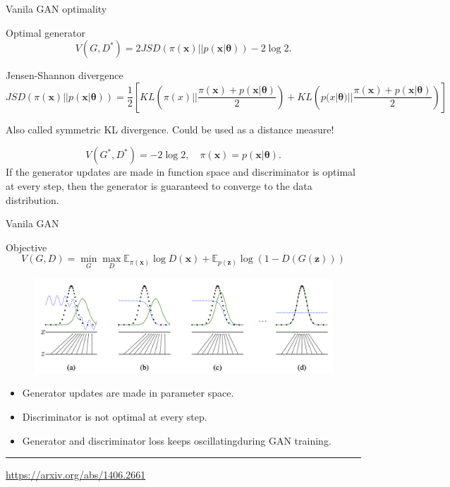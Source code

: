 \documentclass{beamer}
\newcommand{\bx}{\mathbf{x}}
\newcommand{\bz}{\mathbf{z}}
\newcommand{\bbE}{\mathbb{E}}
\newcommand{\btheta}{\boldsymbol{\theta}}
\begin{document}
\begin{frame}{Vanila GAN optimality}
	\begin{block}{Optimal generator}
		\vspace{-0.2cm}
		\[
			V(G, D^*)  = 2JSD(\pi(\bx) || p(\bx | \btheta)) - 2\log 2.
		\]
	\end{block}
	\begin{block}{Jensen-Shannon divergence}
		\vspace{-0.2cm}
		\footnotesize
		\[
			JSD(\pi(\bx) || p(\bx | \btheta)) = \frac{1}{2} \left[KL \left(\pi(x) || \frac{\pi(\bx) + p(\bx | \btheta)}{2}\right) + KL \left(p(x | \btheta) || \frac{\pi(\bx) + p(\bx | \btheta)}{2}\right) \right]
		\]
	\end{block}
	Also called symmetric KL divergence. Could be used as a distance measure!
	
	\[
		V(G^*, D^*) = -2\log 2, \quad \pi(\bx) = p(\bx | \btheta).
	\]
	If the generator updates are made in function space and discriminator is optimal at every step, then the generator is
	guaranteed to converge to the data distribution.
\end{frame}
\begin{frame}{Vanila GAN}
	\begin{block}{Objective}
		\vspace{-0.4cm}
		\[
		V(G, D) = \min_{G} \max_D \bbE_{\pi(\bx)} \log D(\bx) + \bbE_{p(\bz)} \log (1 - D(G(\bz)))
		\]
		\vspace{-0.4cm}
	\end{block}

	\begin{figure}
		\centering
		\includegraphics[width=1.0\linewidth]{figs/gan_1}
	\end{figure}
	\begin{itemize}
		\item Generator updates are made in parameter space.
		\item Discriminator is not optimal at every step.
		\item Generator and discriminator loss keeps oscillatingduring GAN training.
	\end{itemize}
	\vfill
	\hrule\medskip
	{\scriptsize \href{https://arxiv.org/abs/1406.2661}{https://arxiv.org/abs/1406.2661}}
\end{frame}
\end{document}
